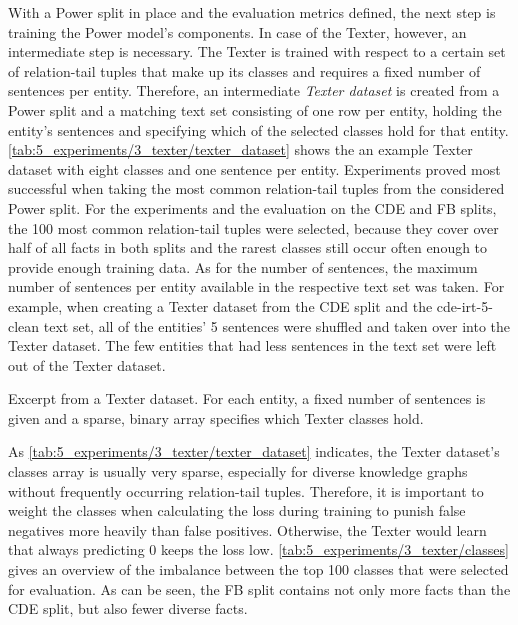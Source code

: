 With a Power split in place and the evaluation metrics defined, the next step is training the Power model's components. In case of the Texter, however, an intermediate step is necessary. The Texter is trained with respect to a certain set of relation-tail tuples that make up its classes and requires a fixed number of sentences per entity. Therefore, an intermediate \emph{Texter dataset} is created from a Power split and a matching text set consisting of one row per entity, holding the entity's sentences and specifying which of the selected classes hold for that entity. \autoref{tab:5_experiments/3_texter/texter_dataset} shows the an example Texter dataset with eight classes and one sentence per entity. Experiments proved most successful when taking the most common relation-tail tuples from the considered Power split. For the experiments and the evaluation on the CDE and FB splits, the 100 most common relation-tail tuples were selected, because they cover over half of all facts in both splits and the rarest classes still occur often enough to provide enough training data. As for the number of sentences, the maximum number of sentences per entity available in the respective text set was taken. For example, when creating a Texter dataset from the CDE split and the cde-irt-5-clean text set, all of the entities' 5 sentences were shuffled and taken over into the Texter dataset. The few entities that had less sentences in the text set were left out of the Texter dataset.

\begin{table}
    \centering
    
    \caption{Excerpt from a Texter dataset. For each entity, a fixed number of sentences is given and a sparse, binary array specifies which Texter classes hold.}
    \label{tab:5_experiments/3_texter/texter_dataset}
\end{table}

As \autoref{tab:5_experiments/3_texter/texter_dataset} indicates, the Texter dataset's classes array is usually very sparse, especially for diverse knowledge graphs without frequently occurring relation-tail tuples. Therefore, it is important to weight the classes when calculating the loss during training to punish false negatives more heavily than false positives. Otherwise, the Texter would learn that always predicting 0 keeps the loss low. \autoref{tab:5_experiments/3_texter/classes} gives an overview of the imbalance between the top 100 classes that were selected for evaluation. As can be seen, the FB split contains not only more facts than the CDE split, but also fewer diverse facts.

